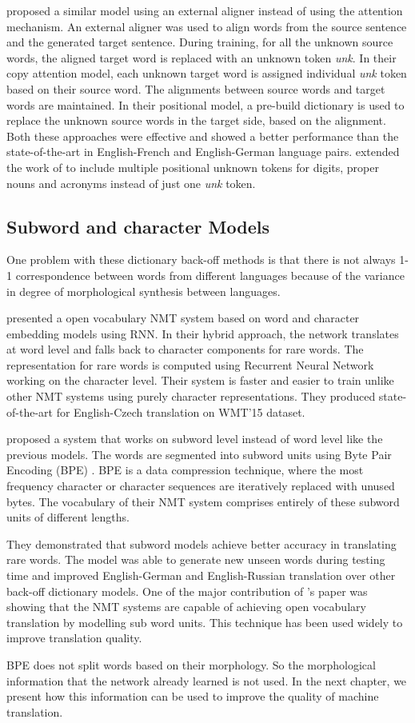 \cite{luong2015addressing} proposed a similar model using an external aligner instead of using the attention mechanism. An external aligner was used to align words from the source sentence and the generated target sentence. During training, for all the unknown source words, the aligned target word is replaced with an unknown token \textit{unk}. In their copy attention model, each unknown target word is assigned individual \textit{unk} token based on their source word. The alignments between source words and target words are maintained. In their positional model, a pre-build dictionary is used to replace the unknown source words in the target side, based on the alignment. Both these approaches were effective and showed a better performance than the state-of-the-art in English-French and English-German language pairs. \cite{choi2017context} extended the work of \cite{luong2015addressing} to include multiple positional unknown tokens for digits, proper nouns and acronyms instead of just one \textit{unk} token. 

\subsection{Subword and character Models}
One problem with these dictionary back-off methods is that there is not always 1-1 correspondence between words from different languages because of the variance in degree of morphological synthesis between languages. 

\cite{luong2016achieving} presented a open vocabulary NMT system based on word and character embedding models using RNN. In their hybrid approach, the network translates at word level and falls back to character components for rare words. The representation for rare words is computed using Recurrent Neural Network working on the character level. Their system is faster and easier to train unlike other NMT systems using purely character representations. They produced state-of-the-art for English-Czech translation on WMT'15 dataset.

\cite{sennrich2015neural} proposed a system that works on subword level instead of word level like the previous models. The words are segmented into subword units using Byte Pair Encoding (BPE) \citep{gage1994new}. BPE is a data compression technique, where the most frequency character or character sequences are iteratively replaced with unused bytes. The vocabulary of their NMT system comprises entirely of these subword units of different lengths. 

They demonstrated that subword models achieve better accuracy in translating rare words. The model was able to generate new unseen words during testing time and improved English-German and English-Russian translation over other back-off dictionary models. One of the major contribution of \citeauthor{sennrich2015neural}'s paper was showing that the NMT systems are capable of achieving open vocabulary translation by modelling sub word units. This technique has been used widely to improve translation quality. 

BPE does not split words based on their morphology. So the morphological information that the network already learned is not used. In the next chapter, we present how this information can be used to improve the quality of machine translation.


